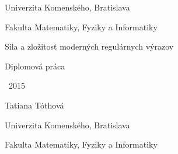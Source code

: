 \documentclass[a4paper,12pt,openany,oneside,header=optiontohead]{scrbook} %
\renewcommand\baselinestretch{1.3} %
\def\mftitle{Sila a zložitosť moderných regulárnych výrazov}
\def\mfthesistype{Diplomová práca}
\def\mfauthor{Tatiana Tóthová}
\def\mfadvisor{RNDr. Michal Forišek, PhD.}
\def\mfdate{2015}
\def\mfuniversity{Univerzita Komenského, Bratislava}
\def\mffakulta{Fakulta Matematiky, Fyziky a Informatiky}
\begin{document}
\frontmatter

\thispagestyle{empty}

\noindent
\begin{center}
\begin{minipage}{0.8\textwidth}
\centerline{\renewcommand\baselinestretch{1.3} \LARGE\sc\mfuniversity}
\centerline{\sc\mffakulta}
\end{minipage}
\end{center}

\vfill
\begin{center}
\begin{minipage}{1\textwidth}
\bigskip\bigskip
\begin{center}
\linespread{1}\LARGE\sc\mftitle
\end{center}
\smallskip
\centerline{\mfthesistype}
\bigskip
\bigskip
\bigskip\bigskip
\end{minipage}
\end{center}
\vfill
{\bf
\begin{minipage}{0.4\textwidth}
\begin{flushleft} \large
~\mfdate
\end{flushleft}
\end{minipage}
\begin{minipage}{0.59\textwidth}
\begin{flushright} \large
\indent\mfauthor
\end{flushright}
\end{minipage}
}
\eject %


\thispagestyle{empty}

\noindent
\begin{center}
\begin{minipage}{0.8\textwidth}
\centerline{\LARGE\sc\mfuniversity}
\centerline{\sc\mffakulta}
\end{minipage}
\end{center}
\end{document}
